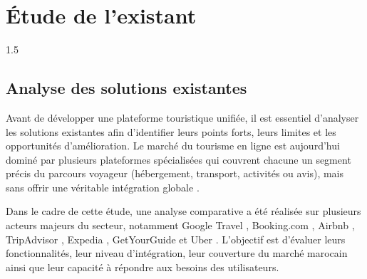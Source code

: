 \documentclass[a4paper,12pt]{report}
\renewcommand{\arraystretch}{1.3}
\begin{document}
\section{Étude de l'existant}
\vspace{0.5cm}
\begin{spacing}{1.5}
\subsection{Analyse des solutions existantes}
\justifying
Avant de développer une plateforme touristique unifiée, il est essentiel d'analyser les solutions existantes afin d'identifier leurs points forts, leurs limites et les opportunités d'amélioration. Le marché du tourisme en ligne est aujourd'hui dominé par plusieurs plateformes spécialisées qui couvrent chacune un segment précis du parcours voyageur (hébergement, transport, activités ou avis), mais sans offrir une véritable intégration globale \cite{buhalis2008progress, gretzel2015smart}.


Dans le cadre de cette étude, une analyse comparative a été réalisée sur plusieurs acteurs majeurs du secteur, notamment Google Travel \cite{googletravel}, Booking.com \cite{booking}, Airbnb \cite{airbnb}, TripAdvisor \cite{tripadvisor2024}, Expedia \cite{expedia2024}, GetYourGuide \cite{getyourguide2024} et Uber \cite{uber2024}. L'objectif est d'évaluer leurs fonctionnalités, leur niveau d'intégration, leur couverture du marché marocain ainsi que leur capacité à répondre aux besoins des utilisateurs.



\begin{table}[H]
\centering
\small
\renewcommand{\arraystretch}{1.3}

\caption{Comparatif des plateformes touristiques existantes}
\label{tab:comparatif_plateformes}

\end{table}
\end{spacing}
\end{document}
